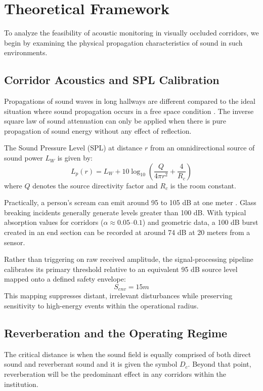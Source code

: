 \documentclass[conference]{IEEEtran}
\begin{document}
\section{Theoretical Framework}

To analyze the feasibility of acoustic monitoring in visually occluded corridors, we begin by examining the physical propagation characteristics of sound in such environments.

\subsection{Corridor Acoustics and SPL Calibration}
Propagations of sound waves in long hallways are different compared to the ideal situation where sound propagation occurs in a free space condition \cite{b28}. The inverse square law of sound attenuation can only be applied when there is pure propagation of sound energy without any effect of reflection.

The Sound Pressure Level (SPL) at distance $r$ from an omnidirectional source of sound power $L_W$ is given by:
\begin{equation}
L_p(r) = L_W + 10 \log_{10}\left(\frac{Q}{4\pi r^2} + \frac{4}{R_c}\right)
\end{equation}
where $Q$ denotes the source directivity factor and $R_c$ is the room constant.

Practically, a person’s scream can emit around 95 to 105 dB at one meter \cite{b5}. Glass breaking incidents generally generate levels greater than 100 dB. With typical absorption values for corridors ($\alpha \approx 0.05$--$0.1$) and geometric data, a 100 dB burst created in an end section can be recorded at around 74 dB at 20 meters from a sensor.

Rather than triggering on raw received amplitude, the signal-processing pipeline calibrates its primary threshold relative to an equivalent 95 dB source level mapped onto a defined safety envelope:
\begin{equation}
S_{env} = 15m
\end{equation}
This mapping suppresses distant, irrelevant disturbances while preserving sensitivity to high-energy events within the operational radius.

\subsection{Reverberation and the Operating Regime}
The critical distance is when the sound field is equally comprised of both direct sound and reverberant sound and it is given the symbol $D_c$. Beyond that point, reverberation will be the predominant effect in any corridors within the institution.
\end{document}
